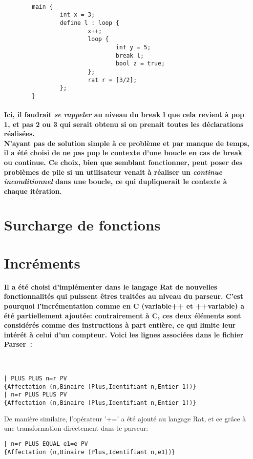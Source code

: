 \documentclass[french]{article}
\begin{document}
\, %
\begin{lstlisting}
        main {
                int x = 3;
                define l : loop {
                        x++;
                        loop {
                                int y = 5;
                                break l;
                                bool z = true;
                        };
                        rat r = [3/2];
                };
        }
\end{lstlisting}
\paragraph{Ici, il faudrait \textit{se rappeler} au niveau du break l que cela revient à pop 1, et pas 2 ou 3 qui serait obtenu si on prenait toutes les déclarations réalisées.\\
N'ayant pas de solution simple à ce problème et par manque de temps, il a été choisi de ne \textbf{pas} pop le contexte d'une boucle en cas de break ou continue.
Ce choix, bien que semblant fonctionner, peut poser des problèmes de pile si un utilisateur venait à réaliser un \textit{continue inconditionnel} dans une boucle, 
ce qui dupliquerait le contexte à chaque itération.}

\section{Surcharge de fonctions}

\section{Incréments}
\paragraph{Il a été choisi d'implémenter dans le langage Rat de nouvelles fonctionnalités qui puissent êtres traitées au niveau du parseur. C'est pourquoi
l'incrémentation comme en C (variable++ et ++variable) a été partiellement ajoutée: contrairement à C, ces deux éléments sont considérés comme
des instructions à part entière, ce qui limite leur intérét à celui d'un compteur. Voici les lignes associées dans le fichier Parser~:}
\,
\begin{lstlisting}
| PLUS PLUS n=r PV 
{Affectation (n,Binaire (Plus,Identifiant n,Entier 1))}
| n=r PLUS PLUS PV 
{Affectation (n,Binaire (Plus,Identifiant n,Entier 1))}
\end{lstlisting}
De manière similaire, l'opérateur '+=' a été ajouté au langage Rat, et ce grâce à une transformation directement dans le parseur:
\begin{lstlisting}
| n=r PLUS EQUAL e1=e PV 
{Affectation (n,Binaire (Plus,Identifiant n,e1))}
\end{lstlisting} 
\end{document}
